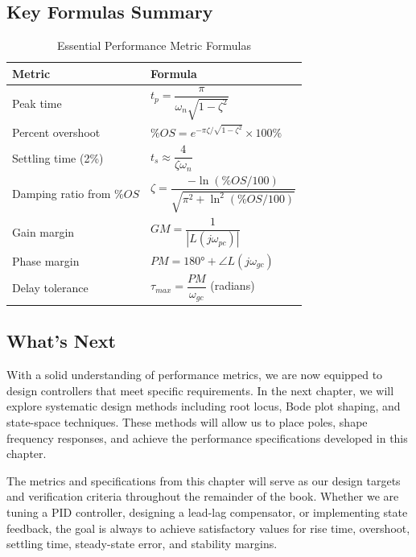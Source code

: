 \subsection{Key Formulas Summary}

\begin{table}[htbp]
\centering
\caption{Essential Performance Metric Formulas}
\begin{tabular}{ll}
\toprule
\textbf{Metric} & \textbf{Formula} \\
\midrule
Peak time & $t_p = \dfrac{\pi}{\omega_n\sqrt{1-\zeta^2}}$ \\[1em]
Percent overshoot & $\%OS = e^{-\pi\zeta/\sqrt{1-\zeta^2}} \times 100\%$ \\[1em]
Settling time (2\%) & $t_s \approx \dfrac{4}{\zeta\omega_n}$ \\[1em]
Damping ratio from $\%OS$ & $\zeta = \dfrac{-\ln(\%OS/100)}{\sqrt{\pi^2 + \ln^2(\%OS/100)}}$ \\[1em]
Gain margin & $GM = \dfrac{1}{|L(j\omega_{pc})|}$ \\[1em]
Phase margin & $PM = 180° + \angle L(j\omega_{gc})$ \\[1em]
Delay tolerance & $\tau_{max} = \dfrac{PM}{\omega_{gc}}$ (radians) \\[1em]
\bottomrule
\end{tabular}
\end{table}

\subsection{What's Next}

With a solid understanding of performance metrics, we are now equipped to design controllers that meet specific requirements. In the next chapter, we will explore systematic design methods including root locus, Bode plot shaping, and state-space techniques. These methods will allow us to place poles, shape frequency responses, and achieve the performance specifications developed in this chapter.

The metrics and specifications from this chapter will serve as our design targets and verification criteria throughout the remainder of the book. Whether we are tuning a PID controller, designing a lead-lag compensator, or implementing state feedback, the goal is always to achieve satisfactory values for rise time, overshoot, settling time, steady-state error, and stability margins.
